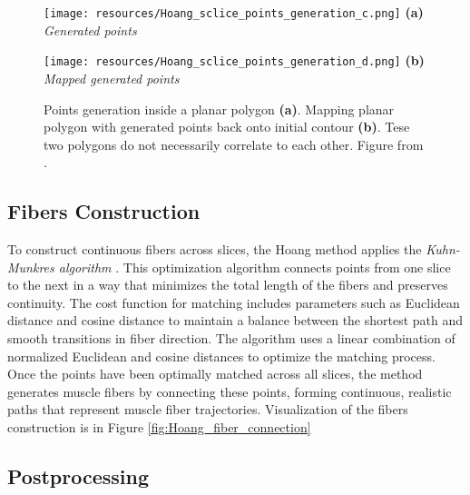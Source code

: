 \documentclass[english, bc, kiv, he, iso690alph, pdf, viewonly]{fasthesis}
\begin{document}
\begin{figure}[h!]
	\begin{minipage}[b]{0.4\textwidth}
		\centering
		\texttt{[image: resources/Hoang\_sclice\_points\_generation\_c.png]}
		\textbf{(a)} \textit{Generated points}
    \end{minipage}
	\hspace{0.02\textwidth}
	\begin{minipage}[b]{0.4\textwidth}
		\centering
		\texttt{[image: resources/Hoang\_sclice\_points\_generation\_d.png]}
		\textbf{(b)} \textit{Mapped generated points}
    \end{minipage}

	\caption{Points generation inside a planar polygon \textbf{(a)}. Mapping planar polygon with generated points back onto initial contour \textbf{(b)}. Tese two polygons do not necessarily correlate to each other. Figure from \cite{HOA23}.}

	\label{fig:Hoang_sclice_points_generation_c_d}
\end{figure}

\subsection{Fibers Construction}

To construct continuous fibers across slices, the Hoang method applies the \textsl{Kuhn-Munkres algorithm} \cite{Kuh55}. This optimization algorithm connects points from one slice to the next in a way that minimizes the total length of the fibers and preserves continuity. The cost function for matching includes parameters such as Euclidean distance and cosine distance to maintain a balance between the shortest path and smooth transitions in fiber direction. The algorithm uses a linear combination of normalized Euclidean and cosine distances to optimize the matching process.  \\

Once the points have been optimally matched across all slices, the method generates muscle fibers by connecting these points, forming continuous, realistic paths that represent muscle fiber trajectories.
Visualization of the fibers construction is in Figure \ref{fig:Hoang_fiber_connection}

\subsection{Postprocessing}
\end{document}
